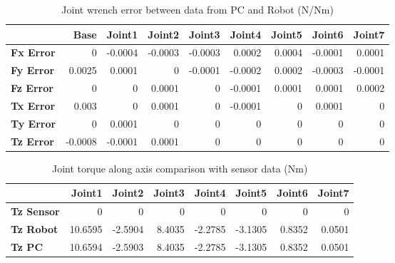 \begin{table}[h!]
	\centering
	\caption{Joint wrench error between data from PC and Robot (N/Nm)}
	\label{wrech_Error_Pose4}
	\begin{tabular}{|l|r|r|r|r|r|r|r|r|}
		\hline
		\textbf{}  & \textbf{Base} & \textbf{Joint1}  & \textbf{Joint2}  & \textbf{Joint3}  & \textbf{Joint4}  & \textbf{Joint5}  & \textbf{Joint6}  & \textbf{Joint7} \\ \hline
		\textbf{Fx Error}  & 0        & -0.0004        & -0.0003        & -0.0003        & 0.0002        & 0.0004        & -0.0001        & 0.0001 \\ \hline
		\textbf{Fy Error}  & 0.0025        & 0.0001        & 0        & -0.0001        & -0.0002        & 0.0002        & -0.0003        & -0.0001 \\ \hline
		\textbf{Fz Error}  & 0        & 0        & 0.0001        & 0        & -0.0001        & 0.0001        & 0.0001        & 0.0002 \\ \hline
		\textbf{Tx Error}  & 0.003        & 0        & 0.0001        & 0        & -0.0001        & 0        & 0.0001        & 0 \\ \hline
		\textbf{Ty Error}  & 0        & 0.0001        & 0        & 0        & 0        & 0        & 0        & 0 \\ \hline
		\textbf{Tz Error}  & -0.0008        & -0.0001        & 0.0001        & 0        & 0        & 0        & 0        & 0 \\ \hline
	\end{tabular}
\end{table}

\begin{table}[h!]
	\centering
	\caption{Joint torque along axis comparison with sensor data (Nm)}
	\label{wrech_Sensor_Pose4}
	\begin{tabular}{|l|r|r|r|r|r|r|r|}
		\hline
		\textbf{} & \textbf{Joint1} & \textbf{Joint2} & \textbf{Joint3} & \textbf{Joint4} & \textbf{Joint5} & \textbf{Joint6} & \textbf{Joint7} \\ \hline
		\textbf{Tz Sensor}  & 0           & 0           & 0            & 0           & 0           & 0           & 0           \\ \hline
		\textbf{Tz Robot}  	& 10.6595           & -2.5904           & 8.4035            & -2.2785           & -3.1305           & 0.8352           & 0.0501           \\ \hline
		\textbf{Tz PC}  	& 10.6594           & -2.5903           & 8.4035            & -2.2785           & -3.1305           & 0.8352           & 0.0501           \\ \hline
	\end{tabular}
\end{table}

